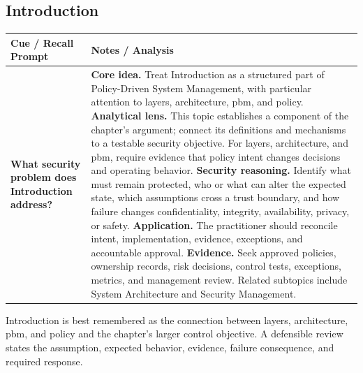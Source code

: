 \documentclass[11pt]{article}
\newcommand{\CornellHeader}{%
\rowcolor{Navy}\color{white}\bfseries Cue / Recall Prompt & \color{white}\bfseries Notes / Analysis\\\hline}
\newcommand{\CornellRow}[2]{%
\cellcolor{CueGray}\RaggedRight\textbf{#1} & \RaggedRight #2\\\hline}
\begin{document}
\subsection*{Introduction}
\begin{longtable}{>{\RaggedRight\arraybackslash}p{}|>{\RaggedRight\arraybackslash}p{}}
\CornellHeader
\CornellRow{What security problem does Introduction address?}{\textbf{Core idea.} Treat Introduction as a structured part of Policy-Driven System Management, with particular attention to layers, architecture, pbm, and policy. \textbf{Analytical lens.} This topic establishes a component of the chapter's argument; connect its definitions and mechanisms to a testable security objective. For layers, architecture, and pbm, require evidence that policy intent changes decisions and operating behavior. \textbf{Security reasoning.} Identify what must remain protected, who or what can alter the expected state, which assumptions cross a trust boundary, and how failure changes confidentiality, integrity, availability, privacy, or safety. \textbf{Application.} The practitioner should reconcile intent, implementation, evidence, exceptions, and accountable approval. \textbf{Evidence.} Seek approved policies, ownership records, risk decisions, control tests, exceptions, metrics, and management review. Related subtopics include System Architecture and Security Management.}
\end{longtable}
\begin{topicsummary}
Introduction is best remembered as the connection between layers, architecture, pbm, and policy and the chapter's larger control objective. A defensible review states the assumption, expected behavior, evidence, failure consequence, and required response.
\end{topicsummary}
\end{document}

